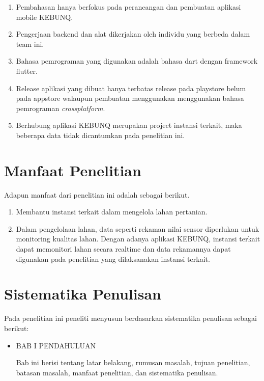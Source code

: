 \begin{flushleft}
\begin{justify}
\end{justify}
\begin{enumerate}
  \item Pembahasan hanya berfokus pada perancangan dan pembuatan aplikasi mobile KEBUNQ.
  \item Pengerjaan backend dan alat dikerjakan oleh individu yang berbeda dalam team ini.
  \item Bahasa pemrograman yang digunakan adalah bahasa dart dengan framework flutter.
  \item Release aplikasi yang dibuat hanya terbatas release pada playstore belum pada appstore walaupun pembuatan menggunakan menggunakan bahasa pemrograman \textit{crossplatform}.
  \item Berhubung aplikasi KEBUNQ merupakan project instansi terkait, maka beberapa data tidak dicantumkan pada penelitian ini.

  \end{enumerate}
\vspace{2cm}


\section{Manfaat Penelitian}

\begin{justify}
  Adapun manfaat dari penelitian ini adalah sebagai berikut.


\end{justify}
\begin{enumerate}
  \item Membantu instansi terkait dalam mengelola lahan pertanian.
  \item Dalam pengelolaan lahan, data seperti rekaman nilai sensor diperlukan untuk monitoring kualitas lahan. Dengan adanya aplikasi KEBUNQ, instansi terkait dapat memonitori lahan secara realtime dan data rekamannya dapat digunakan pada penelitian yang dilaksanakan instansi terkait.

  \end{enumerate}
\vspace{2cm}



\section{Sistematika Penulisan}
Pada penelitian ini peneliti menyusun berdasarkan sistematika penulisan sebagai berikut: \\
\begin{itemize}
  \item \noindent BAB I PENDAHULUAN
  \begin{justify}
  Bab ini berisi tentang latar belakang, rumusan masalah, tujuan penelitian, 
  batasan masalah, manfaat penelitian, dan sistematika penulisan.
  \end{justify}
\end{itemize}


\end{flushleft}
